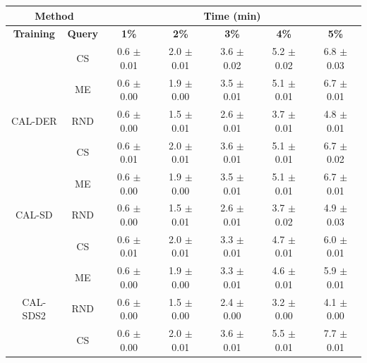 \begin{table}[htbp]
\centering

\begin{tabular*}{\linewidth}{c|c|@{\extracolsep{\fill}}ccccc}
\toprule
\multicolumn{2}{c|}{\textbf{Method}} & \multicolumn{5}{c}{\textbf{Time (min)}} \\
\midrule
\textbf{Training} & \textbf{Query} & \textbf{1\%} & \textbf{2\%} & \textbf{3\%} & \textbf{4\%} & \textbf{5\%}\\
\midrule
 & CS & 0.6 $\pm$ {\small 0.01} & 2.0 $\pm$ {\small 0.01} & 3.6 $\pm$ {\small 0.02} & 5.2 $\pm$ {\small 0.02} & 6.8 $\pm$ {\small 0.03}\\

 & ME & 0.6 $\pm$ {\small 0.00} & 1.9 $\pm$ {\small 0.00} & 3.5 $\pm$ {\small 0.01} & 5.1 $\pm$ {\small 0.01} & 6.7 $\pm$ {\small 0.01}\\

\multirow{-3}{*}{\raggedright\arraybackslash CAL-DER} & RND & 0.6 $\pm$ {\small 0.00} & 1.5 $\pm$ {\small 0.01} & 2.6 $\pm$ {\small 0.01} & 3.7 $\pm$ {\small 0.01} & 4.8 $\pm$ {\small 0.01}\\
\midrule
 & CS & 0.6 $\pm$ {\small 0.01} & 2.0 $\pm$ {\small 0.01} & 3.6 $\pm$ {\small 0.01} & 5.1 $\pm$ {\small 0.01} & 6.7 $\pm$ {\small 0.02}\\

 & ME & 0.6 $\pm$ {\small 0.00} & 1.9 $\pm$ {\small 0.00} & 3.5 $\pm$ {\small 0.01} & 5.1 $\pm$ {\small 0.01} & 6.7 $\pm$ {\small 0.01}\\

\multirow{-3}{*}{\raggedright\arraybackslash CAL-SD} & RND & 0.6 $\pm$ {\small 0.00} & 1.5 $\pm$ {\small 0.01} & 2.6 $\pm$ {\small 0.01} & 3.7 $\pm$ {\small 0.02} & 4.9 $\pm$ {\small 0.03}\\
\midrule
 & CS & 0.6 $\pm$ {\small 0.01} & 2.0 $\pm$ {\small 0.01} & 3.3 $\pm$ {\small 0.01} & 4.7 $\pm$ {\small 0.01} & 6.0 $\pm$ {\small 0.01}\\

 & ME & 0.6 $\pm$ {\small 0.00} & 1.9 $\pm$ {\small 0.00} & 3.3 $\pm$ {\small 0.01} & 4.6 $\pm$ {\small 0.01} & 5.9 $\pm$ {\small 0.01}\\

\multirow{-3}{*}{\raggedright\arraybackslash CAL-SDS2} & RND & 0.6 $\pm$ {\small 0.00} & 1.5 $\pm$ {\small 0.00} & 2.4 $\pm$ {\small 0.00} & 3.2 $\pm$ {\small 0.00} & 4.1 $\pm$ {\small 0.00}\\
\midrule
 & CS & 0.6 $\pm$ {\small 0.00} & 2.0 $\pm$ {\small 0.01} & 3.6 $\pm$ {\small 0.01} & 5.5 $\pm$ {\small 0.01} & 7.7 $\pm$ {\small 0.01}\\


\end{tabular*}
\end{table}
